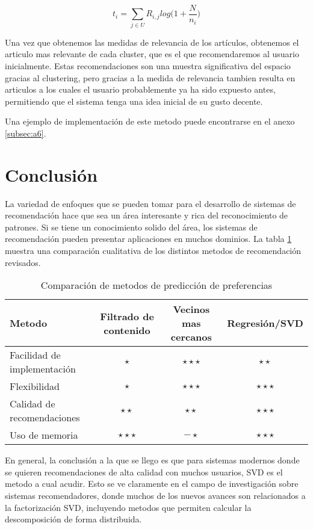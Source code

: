 \documentclass[11pt]{article}
\begin{document}
$$t_i = \sum\limits_{j\in U}R_{i, j}log\big(1 + \frac{N}{n_i}\big)$$

Una vez que obtenemos las medidas de relevancia de los artículos, obtenemos el
articulo mas relevante de cada cluster, que es el que recomendaremos al usuario
inicialmente. Estas recomendaciones son una muestra significativa del espacio
gracias al clustering, pero gracias a la medida de relevancia tambien resulta en
articulos a los cuales el usuario probablemente ya ha sido expuesto antes,
permitiendo que el sistema tenga una idea inicial de su gusto decente.

Una ejemplo de implementación de este metodo puede encontrarse en el anexo
\ref{subsec:a6}.

\section{Conclusión} %



La variedad de enfoques que se pueden tomar para el desarrollo de sistemas de
recomendación hace que sea un área interesante y rica del reconocimiento de
patrones. Si se tiene un conocimiento solido del área, los sistemas de
recomendación pueden presentar aplicaciones en muchos dominios. La tabla
\ref{comparacion} muestra una comparación cualitativa de los distintos metodos
de recomendación revisados.


\begin{table}[t]
    \centering
    \begin{tabular}{|l|c|c|c|}
    \hline
    Metodo & Filtrado de contenido & Vecinos mas cercanos & Regresión/SVD\\
    \hline
    Facilidad de implementación & $\star$ & $\star\star\star$ & $\star\star$\\
    Flexibilidad & $\star$ & $\star\star\star$ & $\star\star\star$ \\
    Calidad de recomendaciones & $\star\star$ & $\star\star$ & $\star\star\star$ \\
    Uso de memoria & $\star\star\star$ & $-\star$ & $\star\star\star$ \\
    \hline
    \end{tabular}
    \caption{Comparación de metodos de predicción de preferencias}
    \label{comparacion}
    \end{table}
   
En general, la conclusión a la que se llego es que para sistemas modernos donde
se quieren recomendaciones de alta calidad con muchos usuarios, SVD es el metodo
a cual acudir. Esto se ve claramente en el campo de investigación sobre sistemas
recomendadores, donde muchos de los nuevos avances son relacionados a la
factorización SVD, incluyendo metodos que permiten calcular la descomposición de
forma distribuida.
\end{document}
